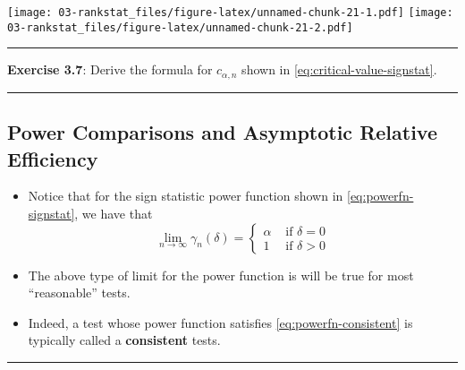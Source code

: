 \documentclass[]{book}
\begin{document}
\texttt{[image: 03-rankstat\_files/figure-latex/unnamed-chunk-21-1.pdf]} \texttt{[image: 03-rankstat\_files/figure-latex/unnamed-chunk-21-2.pdf]}

\begin{center}\rule{0.5\linewidth}{\linethickness}\end{center}

\textbf{Exercise 3.7}: Derive the formula for \(c_{\alpha, n}\) shown in \eqref{eq:critical-value-signstat}.

\begin{center}\rule{0.5\linewidth}{\linethickness}\end{center}

\hypertarget{power-comparisons-and-asymptotic-relative-efficiency}{%
\subsection{Power Comparisons and Asymptotic Relative Efficiency}\label{power-comparisons-and-asymptotic-relative-efficiency}}

\begin{itemize}
\item
  Notice that for the sign statistic power function shown in \eqref{eq:powerfn-signstat},
  we have that
  \begin{equation}
  \lim_{n \longrightarrow \infty} \gamma_{n}(\delta)
  = \begin{cases}
  \alpha & \textrm{ if } \delta = 0 \\
  1 & \textrm{ if } \delta > 0
  \end{cases}
  \label{eq:powerfn-consistent}
  \end{equation}
\item
  The above type of limit for the power function is will be
  true for most ``reasonable'' tests.
\item
  Indeed, a test whose power function satisfies
  \eqref{eq:powerfn-consistent} is typically called a \textbf{consistent} tests.
\end{itemize}

\begin{center}\rule{0.5\linewidth}{\linethickness}\end{center}
\end{document}
